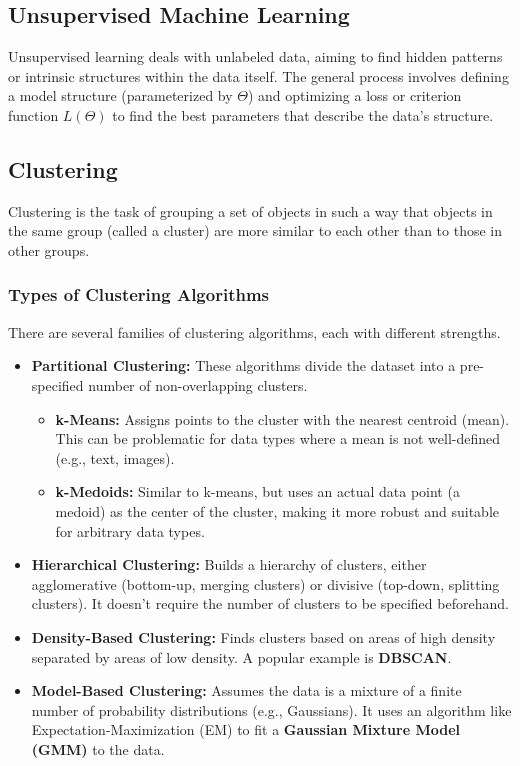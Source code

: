 \documentclass{article}
\begin{document}
\begin{multicols}{2}
	\section{Unsupervised Machine Learning}
	Unsupervised learning deals with unlabeled data, aiming to find hidden patterns or intrinsic structures within the data itself. The general process involves defining a model structure (parameterized by $\Theta$) and optimizing a loss or criterion function $L(\Theta)$ to find the best parameters that describe the data's structure.

	\subsection{Clustering}
	Clustering is the task of grouping a set of objects in such a way that objects in the same group (called a cluster) are more similar to each other than to those in other groups.

	\subsubsection{Types of Clustering Algorithms}
	There are several families of clustering algorithms, each with different strengths.
	\begin{itemize}
		\item \textbf{Partitional Clustering:} These algorithms divide the dataset into a pre-specified number of non-overlapping clusters.
		      \begin{itemize}
			      \item \textbf{k-Means:} Assigns points to the cluster with the nearest centroid (mean). This can be problematic for data types where a mean is not well-defined (e.g., text, images).
			      \item \textbf{k-Medoids:} Similar to k-means, but uses an actual data point (a medoid) as the center of the cluster, making it more robust and suitable for arbitrary data types.
		      \end{itemize}
		\item \textbf{Hierarchical Clustering:} Builds a hierarchy of clusters, either agglomerative (bottom-up, merging clusters) or divisive (top-down, splitting clusters). It doesn't require the number of clusters to be specified beforehand.
		\item \textbf{Density-Based Clustering:} Finds clusters based on areas of high density separated by areas of low density. A popular example is \textbf{DBSCAN}.
		\item \textbf{Model-Based Clustering:} Assumes the data is a mixture of a finite number of probability distributions (e.g., Gaussians). It uses an algorithm like Expectation-Maximization (EM) to fit a \textbf{Gaussian Mixture Model (GMM)} to the data.
	\end{itemize}


\end{multicols}
\end{document}
